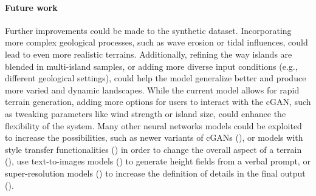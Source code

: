 
\paragraph{Future work}
Further improvements could be made to the synthetic dataset. Incorporating more complex geological processes, such as wave erosion or tidal influences, could lead to even more realistic terrains. Additionally, refining the way islands are blended in multi-island samples, or adding more diverse input conditions (e.g., different geological settings), could help the model generalize better and produce more varied and dynamic landscapes.  While the current model allows for rapid terrain generation, adding more options for users to interact with the cGAN, such as tweaking parameters like wind strength or island size, could enhance the flexibility of the system. 
Many other neural networks models could be exploited to increase the possibilities, such as newer variants of cGANs (\cite{Park2019}), or models with style transfer functionalities (\cite{Gatys2015,Zhu2020}) in order to change the overall aspect of a terrain (\cite{Perche2023a,Perche2023b}), use text-to-images models (\cite{Rombach2021,Radford2021}) to generate height fields from a verbal prompt, or super-resolution models (\cite{Dong2014}) to increase the definition of details in the final output (\cite{Guerin2016a}).







